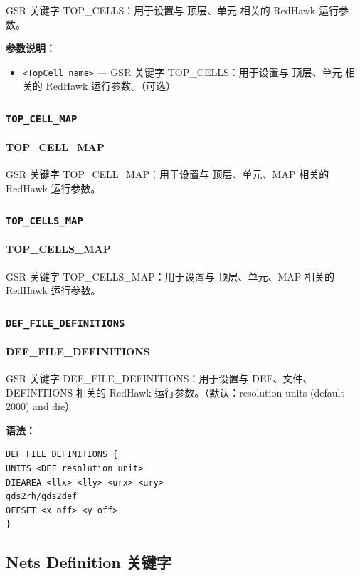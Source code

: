 GSR 关键字 TOP_CELLS：用于设置与 顶层、单元 相关的 RedHawk 运行参数。

\textbf{参数说明：}
\begin{itemize}
\item \texttt{<TopCell\_name>} — GSR 关键字 TOP\_CELLS：用于设置与 顶层、单元 相关的 RedHawk 运行参数。（可选）
\end{itemize}

\subsubsection{\texttt{TOP_CELL_MAP}}
\paragraph*{TOP_CELL_MAP}

GSR 关键字 TOP_CELL_MAP：用于设置与 顶层、单元、MAP 相关的 RedHawk 运行参数。

\subsubsection{\texttt{TOP_CELLS_MAP}}
\paragraph*{TOP_CELLS_MAP}

GSR 关键字 TOP_CELLS_MAP：用于设置与 顶层、单元、MAP 相关的 RedHawk 运行参数。

\subsubsection{\texttt{DEF_FILE_DEFINITIONS}}
\paragraph*{DEF_FILE_DEFINITIONS}

GSR 关键字 DEF_FILE_DEFINITIONS：用于设置与 DEF、文件、DEFINITIONS 相关的 RedHawk 运行参数。（默认：resolution units (default 2000) and die）

\textbf{语法：}
\begin{lstlisting}
DEF_FILE_DEFINITIONS {
UNITS <DEF resolution unit>
DIEAREA <llx> <lly> <urx> <ury>
gds2rh/gds2def
OFFSET <x_off> <y_off>
}
\end{lstlisting}

\subsection{Nets Definition 关键字}
